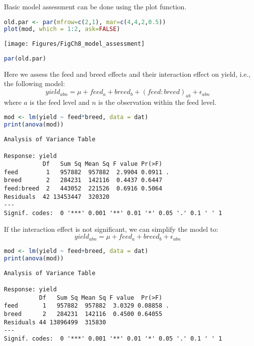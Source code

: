 Basic model assessment can be done using the plot function.

\begin{lstlisting}[language=R, columns=fullflexible, basicstyle=\linespread{0.85}\small\ttfamily, stringstyle=\color{DarkGreen}, keywordstyle=\color{blue}, commentstyle=\color{DarkGreen},]
old.par <- par(mfrow=c(2,1), mar=c(4,4,2,0.5))
plot(mod, which = 1:2, ask=FALSE)
\end{lstlisting}

\texttt{[image: Figures/FigCh8\_model\_assessment]}

\begin{lstlisting}[language=R, columns=fullflexible, basicstyle=\linespread{0.85}\small\ttfamily, stringstyle=\color{DarkGreen}, keywordstyle=\color{blue}, commentstyle=\color{DarkGreen},]
par(old.par)
\end{lstlisting}

\label{two-way-crossed-effects-anova}

Here we assess the feed and breed effects and their interaction effect
on yield, i.e., the following model:
\[yield_{abn} = \mu + feed_a + breed_b + (feed:breed)_{ab} + \epsilon_{abn}\]
where \(a\) is the feed level and \(n\) is the observation within the
feed level.

\begin{lstlisting}[language=R, columns=fullflexible, basicstyle=\linespread{0.85}\small\ttfamily, stringstyle=\color{DarkGreen}, keywordstyle=\color{blue}, commentstyle=\color{DarkGreen},]
mod <- lm(yield ~ feed*breed, data = dat)
print(anova(mod))
\end{lstlisting}
\begin{Verbatim}[fontsize=\small]
Analysis of Variance Table

Response: yield
           Df   Sum Sq Mean Sq F value Pr(>F)
feed        1   957882  957882  2.9904 0.0911 .
breed       2   284231  142116  0.4437 0.6447
feed:breed  2   443052  221526  0.6916 0.5064
Residuals  42 13453447  320320
---
Signif. codes:  0 '***' 0.001 '**' 0.01 '*' 0.05 '.' 0.1 ' ' 1
\end{Verbatim}

If the interaction effect is not significant, we can simplify the model
to: \[yield_{abn} = \mu + feed_a + breed_b + \epsilon_{abn}\]

\begin{lstlisting}[language=R, columns=fullflexible, basicstyle=\linespread{0.85}\small\ttfamily, stringstyle=\color{DarkGreen}, keywordstyle=\color{blue}, commentstyle=\color{DarkGreen},]
mod <- lm(yield ~ feed+breed, data = dat)
print(anova(mod))
\end{lstlisting}
\begin{Verbatim}[fontsize=\small]
Analysis of Variance Table

Response: yield
          Df   Sum Sq Mean Sq F value  Pr(>F)
feed       1   957882  957882  3.0329 0.08858 .
breed      2   284231  142116  0.4500 0.64055
Residuals 44 13896499  315830
---
Signif. codes:  0 '***' 0.001 '**' 0.01 '*' 0.05 '.' 0.1 ' ' 1
\end{Verbatim}

